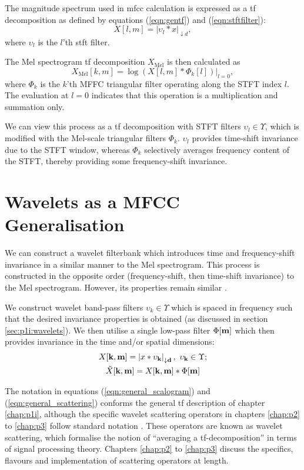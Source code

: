 The magnitude spectrum used in \ac{mfcc} calculation is expressed as a \ac{tf} decomposition as defined by equations (\ref*{eqn:gentf}) and (\ref*{eqn:stftfilter}):
\begin{equation}
    X[l, m] = |\upsilon_l * x|_{\downarrow d},
\end{equation}
where $\upsilon_l$ is the $l$'th \ac{stft} filter.

The Mel spectrogram \ac{tf} decomposition $X_\text{Mel}$ is then calculated as
\begin{equation}
    X_\text{Mel}[k, m] = \log\left(X[l, m] * \Phi_k[l]\right) \bigg|_{l = 0},
\end{equation}
where $\Phi_k$ is the $k$'th MFFC triangular filter operating along the STFT index $l$. The evaluation at $l=0$ indicates that this operation is a multiplication and summation only. 

We can view this process as a \ac{tf} decomposition with STFT filters $\upsilon_l \in \Upsilon$, which is modified with the Mel-scale triangular filters $\Phi_k$. $\upsilon_l$ provides time-shift invariance due to the STFT window, whereas $\Phi_k$ selectively averages frequency content of the STFT, thereby providing some frequency-shift invariance.


\section{Wavelets as a MFCC Generalisation}

We can construct a wavelet filterbank which introduces time and frequency-shift invariance in a similar manner to the Mel spectrogram. This process is constructed in the opposite order (frequency-shift, then time-shift invariance) to the Mel spectrogram. However, its properties remain similar \cite{ws}.

We construct wavelet band-pass filters $\upsilon_k \in \Upsilon$ which is spaced in frequency such that the desired invariance properties is obtained (as discussed in section \ref*{sec:p1i:wavelets}). We then utilise a single low-pass filter $\Phi[\boldsymbol{\mathbf{m}}]$ which then provides invariance in the time and/or spatial dimensions:
\begin{gather}
    \label{eqn:general_scalogram}
    X[\boldsymbol{\mathbf{k}}, \boldsymbol{\mathbf{m}}] = \left|x * \upsilon_{\boldsymbol{\mathbf{k}}}\right|_{\downarrow \boldsymbol{\mathbf{d}}}, \ \upsilon_{\boldsymbol{\mathbf{k}}} \in \Upsilon; \\
    \label{eqn:general_scattering}
    \tilde{X}[\boldsymbol{\mathbf{k}}, \boldsymbol{\mathbf{m}}] = X[\boldsymbol{\mathbf{k}}, \boldsymbol{\mathbf{m}}] * \Phi[\boldsymbol{\mathbf{m}}]
\end{gather}

The notation in equations (\ref*{eqn:general_scalogram}) and (\ref*{eqn:general_scattering}) conforms the general \ac{tf} description of chapter \ref*{chap:p1i}, although the specific wavelet scattering operators in chapters \ref*{chap:p2} to \ref*{chap:p3} follow standard notation \citep{waveletbook}. These operators are known as wavelet scattering, which formalise the notion of ``averaging a \ac{tf}-decomposition'' in terms of signal processing theory. Chapters \ref*{chap:p2} to \ref*{chap:p3} discuss the specifics, flavours and implementation of scattering operators at length.

